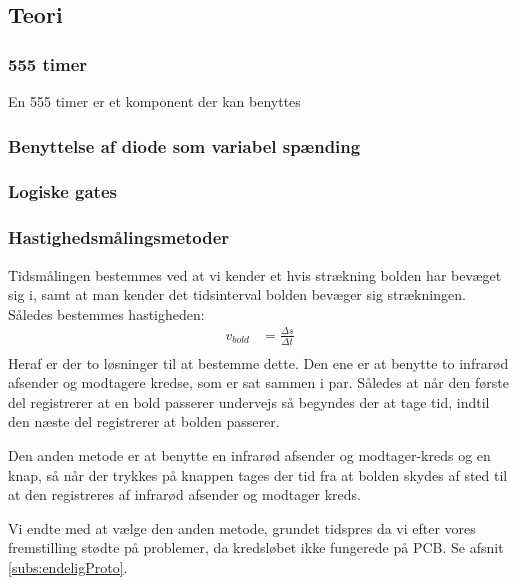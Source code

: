 \subsection{Teori}
\subsubsection{555 timer}
En 555 timer er et komponent der kan benyttes 
\subsubsection{Benyttelse af diode som variabel spænding}
\subsubsection{Logiske gates}
\subsubsection{Hastighedsmålingsmetoder}
Tidsmålingen bestemmes ved at vi kender et hvis strækning bolden har bevæget sig i, samt at man kender det tidsinterval bolden bevæger sig strækningen. Således bestemmes hastigheden:
\begin{align}
	v_{bold} &=\frac{\Delta s}{\Delta t} \\
\end{align}
 Heraf er der to løsninger til at bestemme dette.
Den ene er at benytte to infrarød afsender og modtagere kredse, som er sat sammen i par. Således at når den første del registrerer at en bold passerer undervejs så begyndes der at tage tid, indtil den næste del registrerer at bolden passerer. 

Den anden metode er at benytte en infrarød afsender og modtager-kreds og en knap, så når der trykkes på knappen tages der tid fra at bolden skydes af sted til at den registreres af infrarød afsender og modtager kreds.

Vi endte med at vælge den anden metode, grundet tidspres da vi efter vores fremstilling stødte på problemer, da kredsløbet ikke fungerede på PCB. Se afsnit \ref{subs:endeligProto}.








